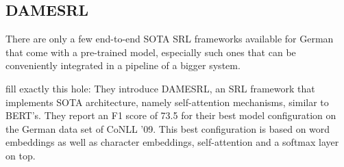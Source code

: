 

\subsection{DAMESRL}

There are only a few end-to-end SOTA SRL frameworks available for German that come with a pre-trained model,
especially such ones that can be conveniently integrated in a pipeline of a bigger system.

\cite{do2018flexible} fill exactly this hole: They introduce DAMESRL, an SRL framework
that implements SOTA architecture, namely self-attention mechanisms, similar to BERT's.
They report an F1 score of 73.5 for their best model configuration on the German data set
of CoNLL '09. This best configuration is based on word embeddings as well as character
embeddings, self-attention and a softmax layer on top.

